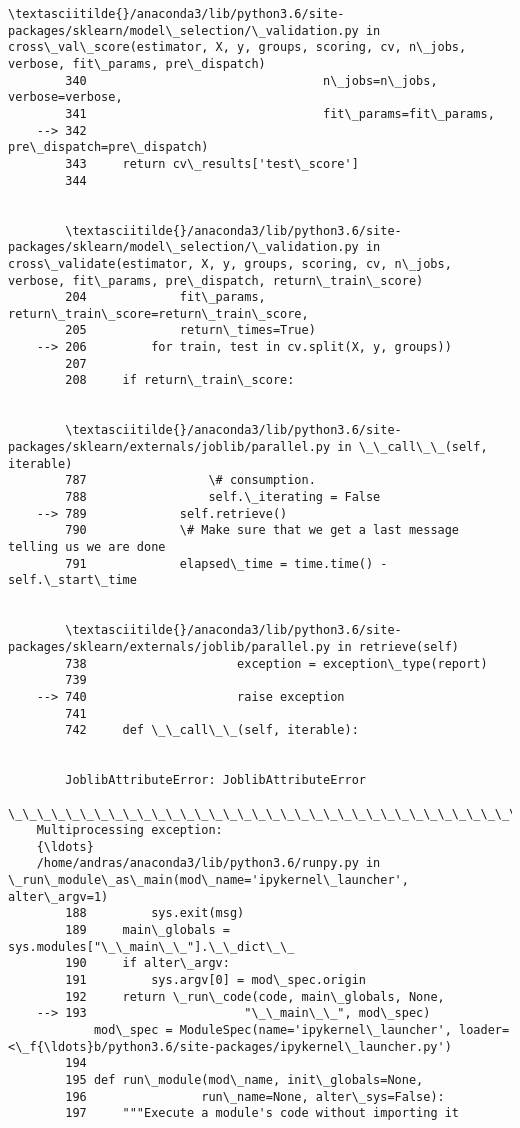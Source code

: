 \documentclass[11pt]{article}
\begin{document}
\begin{Verbatim}[commandchars=\\\{\}]
        \textasciitilde{}/anaconda3/lib/python3.6/site-packages/sklearn/model\_selection/\_validation.py in cross\_val\_score(estimator, X, y, groups, scoring, cv, n\_jobs, verbose, fit\_params, pre\_dispatch)
        340                                 n\_jobs=n\_jobs, verbose=verbose,
        341                                 fit\_params=fit\_params,
    --> 342                                 pre\_dispatch=pre\_dispatch)
        343     return cv\_results['test\_score']
        344 


        \textasciitilde{}/anaconda3/lib/python3.6/site-packages/sklearn/model\_selection/\_validation.py in cross\_validate(estimator, X, y, groups, scoring, cv, n\_jobs, verbose, fit\_params, pre\_dispatch, return\_train\_score)
        204             fit\_params, return\_train\_score=return\_train\_score,
        205             return\_times=True)
    --> 206         for train, test in cv.split(X, y, groups))
        207 
        208     if return\_train\_score:


        \textasciitilde{}/anaconda3/lib/python3.6/site-packages/sklearn/externals/joblib/parallel.py in \_\_call\_\_(self, iterable)
        787                 \# consumption.
        788                 self.\_iterating = False
    --> 789             self.retrieve()
        790             \# Make sure that we get a last message telling us we are done
        791             elapsed\_time = time.time() - self.\_start\_time


        \textasciitilde{}/anaconda3/lib/python3.6/site-packages/sklearn/externals/joblib/parallel.py in retrieve(self)
        738                     exception = exception\_type(report)
        739 
    --> 740                     raise exception
        741 
        742     def \_\_call\_\_(self, iterable):


        JoblibAttributeError: JoblibAttributeError
    \_\_\_\_\_\_\_\_\_\_\_\_\_\_\_\_\_\_\_\_\_\_\_\_\_\_\_\_\_\_\_\_\_\_\_\_\_\_\_\_\_\_\_\_\_\_\_\_\_\_\_\_\_\_\_\_\_\_\_\_\_\_\_\_\_\_\_\_\_\_\_\_\_\_\_
    Multiprocessing exception:
    {\ldots}
    /home/andras/anaconda3/lib/python3.6/runpy.py in \_run\_module\_as\_main(mod\_name='ipykernel\_launcher', alter\_argv=1)
        188         sys.exit(msg)
        189     main\_globals = sys.modules["\_\_main\_\_"].\_\_dict\_\_
        190     if alter\_argv:
        191         sys.argv[0] = mod\_spec.origin
        192     return \_run\_code(code, main\_globals, None,
    --> 193                      "\_\_main\_\_", mod\_spec)
            mod\_spec = ModuleSpec(name='ipykernel\_launcher', loader=<\_f{\ldots}b/python3.6/site-packages/ipykernel\_launcher.py')
        194 
        195 def run\_module(mod\_name, init\_globals=None,
        196                run\_name=None, alter\_sys=False):
        197     """Execute a module's code without importing it
    

\end{Verbatim}
\end{document}

